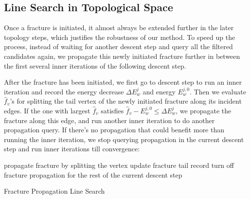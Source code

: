 

\subsection{Line Search in Topological Space}

Once a fracture is initiated, it almost always be extended further in the later topology steps, which justifies the robustness of our method. To speed up the process, instead of waiting for another descent step and query all the filtered candidates again, we propagate this newly initiated fracture further in between the first several inner iterations of the following descent step.

After the fracture has been initiated, we first go to descent step to run an inner iteration and record the energy decrease $\Delta E_w^j$ and energy $E_w^{j,0}$. Then we evaluate $\hat{f}_v$'s for splitting the tail vertex of the newly initiated fracture along its incident edges. If the one with largest $\hat{f}_v$ satisfies $\hat{f}_v - E_w^{j,0} \leq \Delta E_w^j$, we propagate the fracture along this edge, and run another inner iteration to do another propagation query. If there's no propagation that could benefit more than running the inner iteration, we stop querying propagation in the current descent step and run inner iterations till convergence:

\begin{algorithm}[h]
\SetAlgoLined
{}
{
  propagate fracture by splitting the vertex\;
  update fracture tail record\;
}
{
  turn off fracture propagation for the rest of the current descent step\;
}
\caption{Fracture Propagation Line Search}
\end{algorithm}

